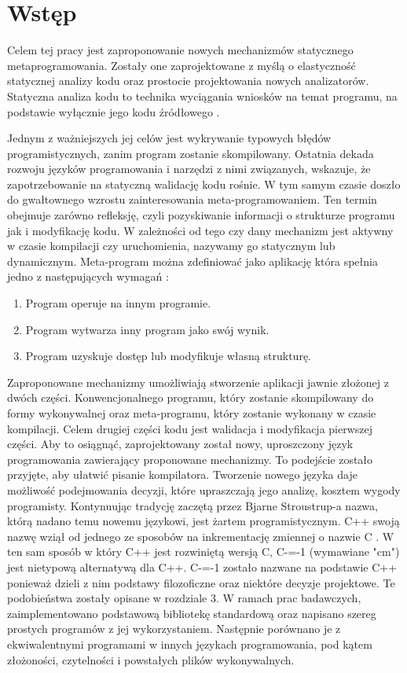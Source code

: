 \section{Wstęp}
Celem tej pracy jest zaproponowanie nowych mechanizmów statycznego 
metaprogramowania.
Zostały one zaprojektowane z myślą o elastyczność statycznej analizy kodu oraz prostocie projektowania nowych analizatorów.
Statyczna analiza kodu to technika wyciągania wniosków na temat programu, na podstawie wyłącznie jego kodu źródłowego \cite{survey_of_metaprograming}.

Jednym z ważniejszych jej celów jest wykrywanie typowych błędów programistycznych, zanim program zostanie skompilowany.
Ostatnia dekada rozwoju języków programowania i narzędzi z nimi związanych, wskazuje, że zapotrzebowanie na statyczną walidację kodu rośnie.
W tym samym czasie doszło do gwałtownego wzrostu zainteresowania meta-programowaniem. Ten termin obejmuje zarówno refleksję, czyli pozyskiwanie informacji o strukturze programu jak i modyfikację kodu. W zależności od tego czy dany mechanizm jest aktywny w czasie kompilacji czy uruchomienia, nazywamy go statycznym lub dynamicznym.
Meta-program można zdefiniować jako aplikację która spełnia jedno z następujących wymagań \cite{nielson2004principles}:
\begin{enumerate}
\item Program operuje na innym programie.
\item Program wytwarza inny program jako swój wynik.
\item Program uzyskuje dostęp lub modyfikuje własną strukturę.
\end{enumerate}

Zaproponowane mechanizmy umożliwiają stworzenie aplikacji jawnie złożonej z dwóch części.
Konwencjonalnego programu, który zostanie skompilowany do formy wykonywalnej oraz meta-programu, który zostanie wykonany w czasie kompilacji. Celem drugiej części kodu jest walidacja i modyfikacja pierwszej części.
Aby to osiągnąć, zaprojektowany został nowy, uproszczony język programowania zawierający proponowane mechanizmy. To podejście zostało przyjęte, aby ułatwić pisanie kompilatora. Tworzenie nowego języka daje możliwość podejmowania decyzji, które upraszczają jego analizę, kosztem wygody programisty.
Kontynuując tradycję zaczętą przez Bjarne Stroustrup-a nazwa, którą nadano temu nowemu językowi, jest żartem programistycznym. C++ swoją nazwę wziął od jednego ze sposobów na inkrementację zmiennej o nazwie C \cite{stroustrup_com}. 
W ten sam sposób w który C++ jest rozwiniętą wersją C, C-=-1 (wymawiane "cm") jest nietypową alternatywą dla C++. C-=-1 zostało nazwane na podstawie C++ ponieważ dzieli z nim podstawy filozoficzne oraz niektóre decyzje projektowe. Te podobieństwa zostały opisane w rozdziale 3.
W ramach prac badawczych, zaimplementowano podstawową bibliotekę standardową oraz napisano szereg prostych programów z jej wykorzystaniem. Następnie porównano je z ekwiwalentnymi programami w innych językach programowania, pod kątem złożoności, czytelności i powstałych plików wykonywalnych.
